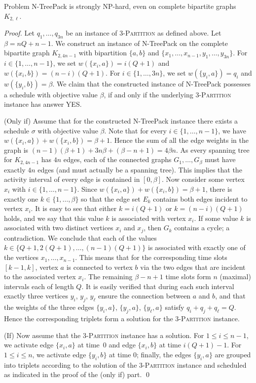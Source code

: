\documentclass[runningheads]{llncs}
\newcommand{\set}[1]{\{ #1 \}}
\newcommand{\fromto}[2]{\set{#1, \ldots, #2}}
\newcommand{\xxxNTP}{{\sc N-TreePack}}
\begin{document}
\begin{theorem}
\label{thm:hardness_complete_bipartite}
Problem {\xxxNTP} is strongly NP-hard, even on complete bipartite graphs $K_{2,\ell}$. 
\end{theorem}
\begin{proof}
Let $q_1,\ldots,q_{3n}$ be an instance of \textsc{3-Partition} as defined above. 
Let $\beta= nQ + n - 1$. 
We construct an instance of {\xxxNTP} on the complete bipartite graph $K_{2,4n-1}$ with bipartition
$\set{a,b}$ and $\set{x_1, \ldots, x_{n-1}, y_1, \ldots, y_{3n}}$. 
For $i\in\{1,\ldots,n-1\}$, we set $w(\set{x_i,a})= i(Q + 1)$ and $w(\set{x_i,b})= (n-i)(Q+1)$. 
For $i\in\{1,\ldots,3n\}$,  we set $w(\set{y_i,a})= q_i$      and $w(\set{y_i,b})= \beta$. 
We claim that the constructed instance of {\xxxNTP} possesses a schedule with objective value $\beta$, 
if and only if the underlying \textsc{3-Partition} instance has answer YES.

(Only if) Assume that for the constructed {\xxxNTP} instance there exists a schedule $\sigma$ 
with objective value $\beta$. 
Note that for every $i \in \{1,\dots,n-1\}$, we have $w(\set{x_i,a}) +w(\set{x_i,b}) = \beta+1$. 
Hence the sum of all the edge weights in the graph is $(n-1)(\beta+1) +3n\beta +(\beta-n+1) = 4\beta n$. 
As every spanning tree for $K_{2, 4n-1}$ has $4n$ edges, each of the connected graphs $G_1,\dots,G_\beta$ 
must have exactly $4n$ edges (and must actually be a spanning tree). This implies that the activity interval of every edge is contained in $[0, \beta]$.
Now consider some vertex $x_i$ with $i\in\{1,\dots,n-1\}$. 
Since $w(\set{x_i,a}) + w(\set{x_i,b})=\beta+1$, there is exactly one $k\in\fromto{1}{\beta}$ so 
that the edge set $E_k$ contains both edges incident to vertex $x_i$. 
It is easy to see that either $k=i(Q+1)$ or $k=(n-i)(Q+1)$ holds, and we say that this value $k$ 
is associated with vertex $x_i$.
If some value $k$ is associated with two distinct vertices $x_i$ and $x_j$, then $G_k$ contains 
a cycle; a contradiction.
We conclude that each of the values $k\in\set{Q+1,2(Q+1),\ldots,(n-1)(Q+1)}$ is associated with
exactly one of the vertices $x_1,\ldots,x_{n-1}$.
This means that for the corresponding time slots $[k-1,k]$, vertex $a$ is connected to vertex $b$
via the two edges that are incident to the associated vertex $x_i$.
The remaining $\beta-n+1$ time slots form $n$ (maximal) intervals each of length $Q$.
It is easily verified that during each such interval exactly three vertices $y_i$, $y_j$, $y_{\ell}$
ensure the connection between $a$ and $b$, and that the weights of the three edges $\{y_i,a\}$,
$\{y_j,a\}$, $\{y_{\ell},a\}$ satisfy $q_i+q_j+q_{\ell}=Q$.
Hence the corresponding triplets form a solution for the \textsc{3-Partition} instance.

(If) Now assume that the \textsc{3-Partition} instance has a solution. 
For $1\le i\le n-1$, we activate edge $\set{x_i,a}$ at time~$0$ and edge $\set{x_i,b}$ at time $i(Q+1)-1$.
For $1\le i\le n$, we activate edge $\set{y_i,b}$ at time $0$; finally, the edges $\set{y_i,a}$ are
grouped into triplets according to the solution of the \textsc{3-Partition} instance and scheduled
as indicated in the proof of the (only if) part.
\qed
\end{proof}
\end{document}
